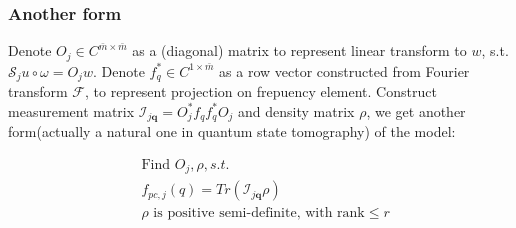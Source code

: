 \documentclass[UTF8]{beamer}
\begin{document}
\begin{frame}\frametitle{Another form}


Denote $O_j \in C^{\bar{m} \times \bar{m}}$ as a (diagonal) matrix to represent linear transform to $w$, s.t. $\mathcal{S}_{j} u \circ \omega = O_j w$. Denote $f_q^* \in C^{1 \times \bar{m}}$ as a row vector  constructed from Fourier transform $\mathcal{F}$, to represent projection on frepuency element. Construct measurement matrix $ \mathcal{I}_{j \mathbf{q}} = O_j^*f_qf_q^*O_j$ and density matrix $\rho$, we get another form(actually a natural one in quantum state tomography) of the model:



\begin{equation}
\label{lift}
\begin{aligned}
&\mbox{Find } O_j,\rho,s.t.\\
&f_{pc,j}(q) = Tr(\mathcal{I}_{j \mathbf{q}} \rho )\\
&\rho \mbox{ is positive semi-definite, with rank}\leq r 
\end{aligned}
\end{equation}

\end{frame}
\end{document}

